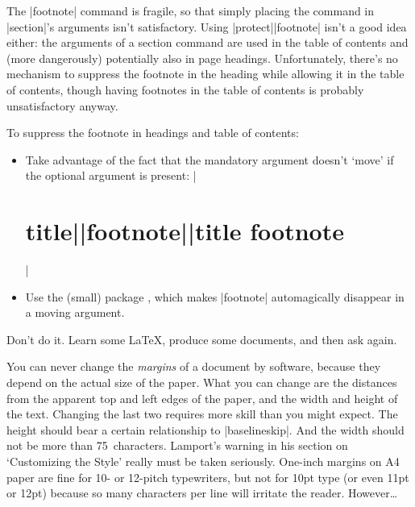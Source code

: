 
The \cs|footnote| command is fragile, so that simply placing the
command in \cs|section|'s arguments isn't satisfactory.  Using
\cs|protect|\cs|footnote| isn't a good idea either: the arguments of a
section command are used in the table of contents and (more
dangerously) potentially also in page headings.  Unfortunately,
there's no mechanism to suppress the footnote in the heading while
allowing it in the table of contents, though having footnotes in the
table of contents is probably unsatisfactory anyway.

To suppress the footnote in headings and table of contents:
\begin{itemize}
\item Take advantage of the fact that the mandatory argument doesn't
  `move' if the optional argument is present:
  |\section[title]{title|\cs|footnote||{title footnote}}|
\item Use the (small) package , which makes
  \cs|footnote| automagically disappear in a moving argument.
\end{itemize}


Don't do it. Learn some \LaTeX{}, produce some 
documents, and then ask again. 
     
You can never change the  \emph{margins} of a document by software, 
because they depend on the actual size of the paper.  What you can change 
are the distances from the apparent top and left edges of the paper, 
and the width and height of the text. Changing the last two requires 
more skill than you might expect. The height should bear a certain 
relationship to \cs|baselineskip|. And the width should not be more 
than 75~characters. Lamport's warning in his section on 
`Customizing the Style' really must be taken seriously. One-inch 
margins on A4 paper are fine for 10- or 12-pitch typewriters, but not 
for 10pt type (or even 11pt or 12pt) because so many 
characters per line will irritate the reader.  However\dots{}
%

%


